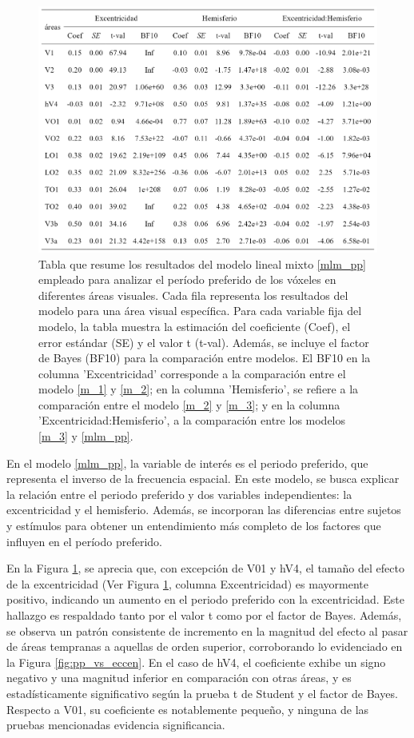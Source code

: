 \begin{figure}[h]
	\centering
	\includegraphics[scale=0.8]{Graphics/table_pp}
	\caption{Tabla que resume los resultados del modelo lineal mixto \ref{mlm_pp} empleado para analizar el per\'iodo preferido de los v\'oxeles en diferentes áreas visuales. Cada fila representa los resultados del modelo para una área visual específica. Para cada variable fija del modelo, la tabla muestra la estimación del coeficiente (Coef), el error estándar (SE) y el valor t (t-val). Además, se incluye el factor de Bayes (BF10) para la comparación entre modelos. El BF10 en la columna 'Excentricidad' corresponde a la comparación entre el modelo \ref{m_1} y \ref{m_2}; en la columna 'Hemisferio', se refiere a la comparación entre el modelo \ref{m_2} y \ref{m_3}; y en la columna 'Excentricidad:Hemisferio', a la comparación entre los modelos \ref{m_3} y \ref{mlm_pp}.}
	\label{fig:mlm_results_pp}
\end{figure}

En el modelo \ref{mlm_pp}, la variable de interés es el periodo preferido, que representa el inverso de la frecuencia espacial. En este modelo, se busca explicar la relación entre el periodo preferido y dos variables independientes: la excentricidad y el hemisferio. Además, se incorporan las diferencias entre sujetos y estímulos para obtener un entendimiento más completo de los factores que influyen en el per\'iodo preferido.

En la Figura \ref{fig:mlm_results_pp}, se aprecia que, con excepción de V01 y hV4, el tamaño del efecto de la excentricidad (Ver Figura \ref{fig:mlm_results_pp}, columna Excentricidad) es mayormente positivo, indicando un aumento en el periodo preferido con la excentricidad. Este hallazgo es respaldado tanto por el valor t como por el factor de Bayes. Además, se observa un patrón consistente de incremento en la magnitud del efecto al pasar de áreas tempranas a aquellas de orden superior, corroborando lo evidenciado en la Figura \ref{fig:pp_vs_eccen}. En el caso de hV4, el coeficiente exhibe un signo negativo y una magnitud inferior en comparación con otras áreas, y es estadísticamente significativo según la prueba t de Student y  el factor de Bayes. Respecto a V01, su coeficiente es notablemente pequeño, y ninguna de las pruebas mencionadas evidencia significancia.


